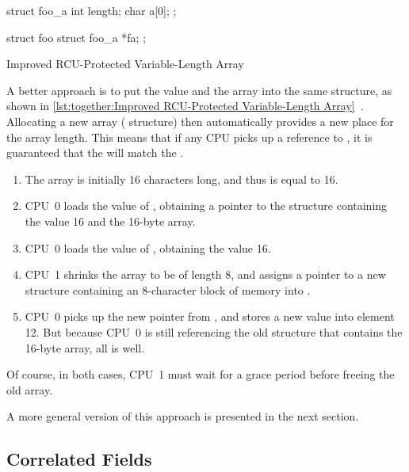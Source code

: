 \begin{listing}
\begin{VerbatimL}[tabsize=8]
struct foo_a {
	int length;
	char a[0];
};

struct foo {
	struct foo_a *fa;
};
\end{VerbatimL}
\caption{Improved RCU-Protected Variable-Length Array}
\label{lst:together:Improved RCU-Protected Variable-Length Array}
\end{listing}

A better approach is to put the value and the array into the same structure,
as shown in
\cref{lst:together:Improved RCU-Protected Variable-Length Array}~\cite{Arcangeli03}.
Allocating a new array ( structure) then automatically provides
a new place for the array length.
This means that if any CPU picks up a reference to , it is
guaranteed that the  will match the .

\begin{enumerate}
\item	The array is initially 16 characters long, and thus 
	is equal to 16.
\item	CPU~0 loads the value of , obtaining a pointer to
	the structure containing the value 16 and the 16-byte array.
\item	CPU~0 loads the value of , obtaining the value 16.
\item	CPU~1 shrinks the array to be of length 8, and assigns a pointer
	to a new  structure containing an 8-character block
	of memory into .
\item	CPU~0 picks up the new pointer from , and stores a
	new value into element 12.
	But because CPU~0 is still referencing the old 
	structure that contains the 16-byte array, all is well.
\end{enumerate}

Of course, in both cases, CPU~1 must wait for a grace period before
freeing the old array.

A more general version of this approach is presented in the next section.

\subsection{Correlated Fields}
\label{sec:together:Correlated Fields}

